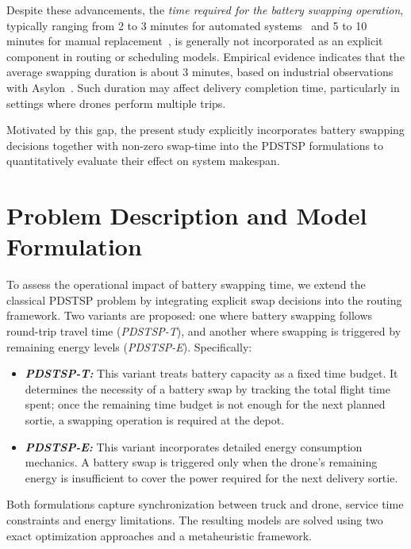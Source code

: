 \documentclass[3p, authoryear, 11pt]{elsarticle}
\begin{document}
Despite these advancements, the \textit{time required for the battery swapping operation}, typically ranging from 2 to 3 minutes for automated systems~\citep{vilkki_automatic_2024,cokyasar_designing_2021} and 5 to 10 minutes for manual replacement~\citep{fhwa_uas_2018}, is generally not incorporated as an explicit component in routing or scheduling models. 
Empirical evidence indicates that the average swapping duration is about 3 minutes, based on industrial observations with Asylon~\citep{cokyasar_designing_2021}. 
Such duration may affect delivery completion time, particularly in settings where drones perform multiple trips. 

Motivated by this gap, the present study explicitly incorporates battery swapping decisions together with non-zero swap-time into the PDSTSP formulations to quantitatively evaluate their effect on system makespan.

\section{Problem Description and Model Formulation}
\label{sec:problem_description}

To assess the operational impact of battery swapping time, we extend the classical PDSTSP problem by integrating explicit swap decisions into the routing framework. Two variants are proposed: one where battery swapping follows round-trip travel time (\textit{PDSTSP-T}), and another where swapping is triggered by remaining energy levels (\textit{PDSTSP-E}). Specifically:
\begin{itemize}
    \item \textbf{\textit{PDSTSP-T: }} This variant treats battery capacity as a fixed time budget. It determines the necessity of a battery swap by tracking the total flight time spent; once the remaining time budget is not enough for the next planned sortie, a swapping operation is required at the depot.
    \label{sec:time_model_des}
    
    \item \textbf{\textit{PDSTSP-E: }} This variant incorporates detailed energy consumption mechanics. A battery swap is triggered only when the drone's remaining energy is insufficient to cover the power required for the next delivery sortie.
    \label{sec:en_model_des}
\end{itemize}

Both formulations capture synchronization between truck and drone, service time constraints and energy limitations. 
The resulting models are solved using two exact optimization approaches and a metaheuristic framework.
\end{document}
